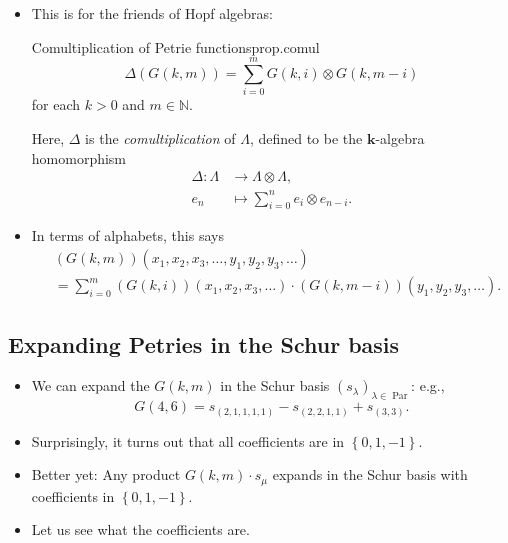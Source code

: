 \documentclass[numbers=enddot,12pt,final,onecolumn,notitlepage]{scrartcl}%
\newcommand{\defn}[1]{{\color{darkred}\emph{#1}}}
\newcommand{\0}{\phantom{c}}
\let\sumnonlimits\sum
\renewcommand{\sum}{\sumnonlimits\limits}
\begin{document}
\begin{itemize}
\item This is for the friends of Hopf algebras:%
\begin{proposition}{Comultiplication of Petrie functions}{prop.comul}
\[
\Delta\left(  G\left(  k,m\right)  \right)  =\sum_{i=0}^{m}G\left(
k,i\right)  \otimes G\left(  k,m-i\right)
\]
for each $k>0$ and $m\in\mathbb{N}$.
\end{proposition}

Here, \defn{$\Delta$} is the \defn{comultiplication} of $\Lambda$, defined to
be the $\mathbf{k}$-algebra homomorphism%
\begin{align*}
\Delta:\Lambda &  \rightarrow\Lambda\otimes\Lambda,\\
e_{n}  &  \mapsto\sum_{i=0}^{n}e_{i}\otimes e_{n-i}.
\end{align*}


\item In terms of alphabets, this says%
\begin{align*}
&  \left(  G\left(  k,m\right)  \right)  \left(  x_{1},x_{2},x_{3}%
,\ldots,y_{1},y_{2},y_{3},\ldots\right) \\
&  =\sum_{i=0}^{m}\left(  G\left(  k,i\right)  \right)  \left(  x_{1}%
,x_{2},x_{3},\ldots\right)  \cdot\left(  G\left(  k,m-i\right)  \right)
\left(  y_{1},y_{2},y_{3},\ldots\right)  .
\end{align*}

\end{itemize}

\subsection{Expanding Petries in the Schur basis}

\begin{itemize}
\item We can expand the $G\left(  k,m\right)  $ in the Schur basis $\left(
s_{\lambda}\right)  _{\lambda\in\operatorname*{Par}}$: e.g.,%
\[
G\left(  4,6\right)  =s_{\left(  2,1,1,1,1\right)  }-s_{\left(
2,2,1,1\right)  }+s_{\left(  3,3\right)  }.
\]


\item Surprisingly, it turns out that all coefficients are in $\left\{
0,1,-1\right\}  $.

\item Better yet: Any product $G\left(  k,m\right)  \cdot s_{\mu}$ expands in
the Schur basis with coefficients in $\left\{  0,1,-1\right\}  $.

\item Let us see what the coefficients are.
\end{itemize}
\end{document}

